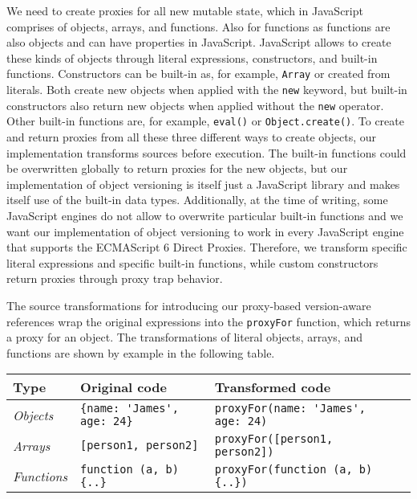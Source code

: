 We need to create proxies for all new mutable state, which in JavaScript comprises of objects, arrays, and functions.
Also for functions as functions are also objects and can have properties in JavaScript.
JavaScript allows to create these kinds of objects through literal expressions, constructors, and built-in functions.
Constructors can be built-in as, for example, \lstinline{Array} or created from literals.
Both create new objects when applied with the \lstinline{new} keyword, but built-in constructors also return new objects when applied without the \lstinline{new} operator.
Other built-in functions are, for example, \lstinline{eval()} or \lstinline{Object.create()}.
To create and return proxies from all these three different ways to create objects, our implementation transforms sources before execution.
The built-in functions could be overwritten globally to return proxies for the new objects, but our implementation of object versioning is itself just a JavaScript library and makes itself use of the built-in data types.
Additionally, at the time of writing, some JavaScript engines do not allow to overwrite particular built-in functions and we want our implementation of object versioning to work in every JavaScript engine that supports the ECMAScript 6 Direct Proxies.
Therefore, we transform specific literal expressions and specific built-in functions, while custom constructors return proxies through proxy trap behavior.

The source transformations for introducing our proxy-based version-aware references wrap the original expressions into the \lstinline{proxyFor} function, which returns a proxy for an object.
The transformations of literal objects, arrays, and functions are shown by example in the following table.

\begin{center}
    \begin{tabular}{| l | l | l | l |}
    \hline
    Type & Original code & Transformed code \\ \hline
    \emph{Objects} & \lstinline|{name: 'James', age: 24}| & \lstinline|proxyFor(name: 'James', age: 24)| \\ \hline
    \emph{Arrays} & \lstinline|[person1, person2]| & \lstinline|proxyFor([person1, person2])| \\ \hline
    \emph{Functions} & \lstinline|function (a, b) {..}| & \lstinline|proxyFor(function (a, b) {..})| \\ \hline
    \end{tabular}
\end{center}

